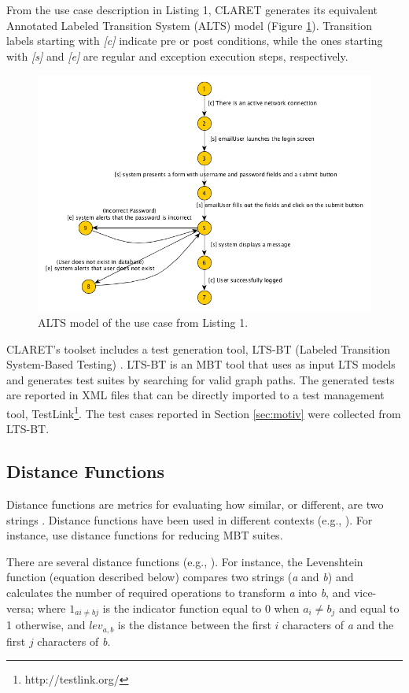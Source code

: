 From the use case description in Listing 1, CLARET generates its equivalent Annotated Labeled Transition System (ALTS) model \citep{tretmans2008model} (Figure \ref{fig:alts}). Transition labels starting with \textit{[c]} indicate pre or post conditions, while the ones starting with \textit{[s]} and \textit{[e]} are regular and exception execution steps, respectively.

\begin{figure}[h!] 
\centering 
\includegraphics[width=.5\textwidth]{figs/UserLogin.png}
\caption{ALTS model of the use case from Listing 1.}
\label{fig:alts}
\end{figure}

CLARET's toolset includes a test generation tool, LTS-BT (Labeled Transition System-Based Testing) \citep{cartaxo2008lts}. LTS-BT is an MBT tool that uses as input LTS models and generates test suites by searching for valid graph paths. The generated tests are reported in XML files that can be directly imported to a test management tool, TestLink\footnote{http://testlink.org/}.
The test cases reported in Section \ref{sec:motiv} were collected from LTS-BT.

\subsection{Distance Functions}

Distance functions are metrics for evaluating how similar, or different, are two strings \citep{coutinho2016analysis}. Distance functions have been used in different contexts (e.g., \citep{runkler2000automatic,okuda1976method,lubis2018combination}). For instance, \citet{coutinho2016analysis} use distance functions for reducing MBT suites. 

There are several distance functions (e.g., \citep{hamming1950error,han2007efficient:LCS,huang2008similaritycosine,de1mahalanobis:jaro,Levenshtein_SPD66}). For instance, the Levenshtein function \citep{Levenshtein_SPD66,kruskal1983overview} (equation described below) compares two strings (\textit{a} and \textit{b}) and calculates the number of required operations to transform \textit{a} into \textit{b}, and vice-versa; where $1_{ai \neq bj}$ is the indicator function equal to 0 when $a_{i} \neq b_{j}$ and equal to 1 otherwise, and $lev_{a,b}$ is the distance between the first $i$ characters of \textit{a} and the first $j$ characters of \textit{b}.

